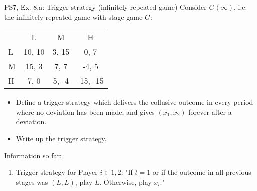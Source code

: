 \begin{frame}{PS7, Ex. 8.a: Trigger strategy (infinitely repeated game)}
    Consider $G(\infty)$, i.e. the infinitely repeated game with stage game $G$: \vspace{-6pt}
    \begin{table}
      \begin{tabular}{l|c|c|c|}
        \multicolumn{1}{c}{} & \multicolumn{1}{c}{L} & \multicolumn{1}{c}{M} & \multicolumn{1}{c}{H} \\\cline{2-4}
        L & 10, 10 & 3, 15 & 0, 7 \\\cline{2-4}
        M & 15, 3 & 7, 7 & -4, 5 \\\cline{2-4}
        H & 7, 0 & 5, -4 & -15, -15 \\\cline{2-4}
      \end{tabular}
    \end{table}
    \begin{itemize}
      \item[(a)] Define a trigger strategy which delivers the collusive outcome in every period where no deviation has been made, and gives $(x_1, x_2)$ forever after a deviation.
    \end{itemize}
  \begin{multicols}{2}
    \begin{itemize}
      \item[(Step a)] Write up the trigger strategy.
    \end{itemize}
    \vfill\null\columnbreak
    Information so far:
    \begin{enumerate}
      \item Trigger strategy for Player $i\in1,2$: "If $t=1$ or if the outcome in all previous stages was $(L,L)$, play $L$. Otherwise, play $x_i$."
    \end{enumerate}
    \vfill\null
  \end{multicols}
\end{frame}

